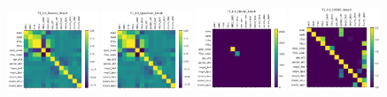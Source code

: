 \begin{figure}
    \centering
    \includegraphics[width=0.24\textwidth]{chap6/figs/T1_0.0_Pearson_Result.png}
    \includegraphics[width=0.24\textwidth]{chap6/figs/T1_0.0_Spearman_Result.png}
    \includegraphics[width=0.24\textwidth]{chap6/figs/T1_0.0_Glasso_Result.png}
    \includegraphics[width=0.24\textwidth]{chap6/figs/T1_0.0_CODEC_Result.png}
    

\end{figure}
